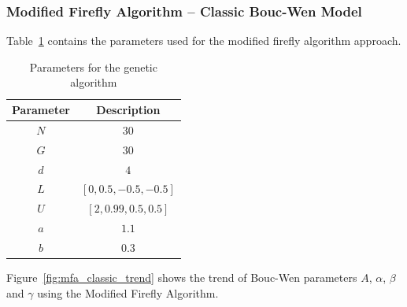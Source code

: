 \subsubsection{Modified Firefly Algorithm -- Classic Bouc-Wen Model}

Table~\ref{tab:mfa_classic_params} contains the parameters used for the
modified firefly algorithm approach. 

\begin{table}[H]
	\centering
	\begin{tabular}{c c}
		\toprule
		\textbf{Parameter} & \textbf{Description} \\ \toprule
		$N$			& $30$ \\
		$G$			& $30$ \\
		$d$			& $4$  \\
		$L$			& $\left[0, 0.5, -0.5, -0.5\right]$ \\
		$U$			& $\left[2, 0.99, 0.5, 0.5\right]$ \\ 
		$a$			& $1.1$ \\
		$b$			& $0.3$ \\ \bottomrule
	\end{tabular}
	\caption{Parameters for the genetic algorithm}
	\label{tab:mfa_classic_params}
\end{table}

Figure~\ref{fig:mfa_classic_trend} shows the trend of Bouc-Wen parameters
$A$, $\alpha$, $\beta$ and $\gamma$ using the Modified Firefly Algorithm.

